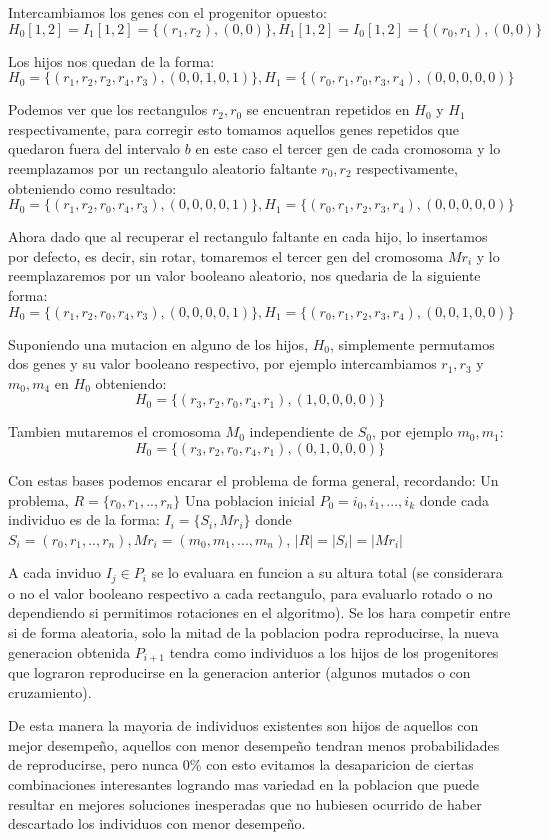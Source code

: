 \documentclass[10pt]{article}
\begin{document}
Intercambiamos los genes con el progenitor opuesto:
$$H_0[1,2] = I_1[1,2] = \{(r_1,r_2),(0,0)\}, H_1[1,2] = I_0[1,2] = \{(r_0,r_1),(0,0)\}$$ 

Los hijos nos quedan de la forma: 
$$H_0=\{(r_1,r_2,r_2,r_4,r_3),(0,0,1,0,1)\}, H_1 = \{(r_0,r_1,r_0,r_3,r_4),(0,0,0,0,0)\}$$

Podemos ver que los rectangulos $r_2, r_0$ se encuentran repetidos en $H_0$ y $H_1$ respectivamente, para corregir esto tomamos aquellos genes repetidos que quedaron fuera del intervalo $b$ en este caso el tercer gen de cada cromosoma y lo reemplazamos por un rectangulo aleatorio faltante $r_0, r_2$ respectivamente, obteniendo como resultado:
$$H_0=\{(r_1,r_2,r_0,r_4,r_3),(0,0,0,0,1)\}, H_1 = \{(r_0,r_1,r_2,r_3,r_4),(0,0,0,0,0)\}$$

Ahora dado que al recuperar el rectangulo faltante en cada hijo, lo insertamos por defecto, es decir, sin rotar, tomaremos el tercer gen del cromosoma $Mr_i$ y lo reemplazaremos por un valor booleano aleatorio, nos quedaria de la siguiente forma:
$$H_0=\{(r_1,r_2,r_0,r_4,r_3),(0,0,0,0,1)\}, H_1 = \{(r_0,r_1,r_2,r_3,r_4),(0,0,1,0,0)\}$$

Suponiendo una mutacion en alguno de los hijos, $H_0$, simplemente permutamos dos genes y su valor booleano respectivo, por ejemplo intercambiamos $r_1,r_3$ y $m_0,m_4$ en $H_0$ obteniendo:
$$H_0=\{(r_3,r_2,r_0,r_4,r_1),(1,0,0,0,0)\}$$

Tambien mutaremos el cromosoma $M_0$ independiente de $S_0$, por ejemplo $m_0,m_1$:
$$H_0=\{(r_3,r_2,r_0,r_4,r_1),(0,1,0,0,0)\}$$

Con estas bases podemos encarar el problema de forma general, recordando: 
Un problema, $R = \{r_0,r_1,..,r_n\}$
Una poblacion inicial $P_0={i_0,i_1,...,i_k}$ donde cada individuo es de la forma:
$I_i = \{S_i,Mr_i\}$ donde $S_i = (r_0,r_1,..,r_n), Mr_i = (m_0, m_1,...,m_n)$, $|R| = |S_i| = |Mr_i|$

A cada inviduo $I_j \in P_i$ se lo evaluara en funcion a su altura total (se considerara o no el valor booleano respectivo a cada rectangulo, para evaluarlo rotado o no dependiendo si permitimos rotaciones en el algoritmo). Se los hara competir entre si de forma aleatoria, solo la mitad de la poblacion podra reproducirse, la nueva generacion obtenida $P_{i+1}$ tendra como individuos a los hijos de los progenitores que lograron reproducirse en la generacion anterior (algunos mutados o con cruzamiento). 

De esta manera la mayoria de individuos existentes son hijos de aquellos con mejor desempeño, aquellos con menor desempeño tendran menos probabilidades de reproducirse, pero nunca 0\% con esto evitamos la desaparicion de ciertas combinaciones interesantes logrando mas variedad en la poblacion que puede resultar en mejores soluciones inesperadas que no hubiesen ocurrido de haber descartado los individuos con menor desempeño.
\end{document}
